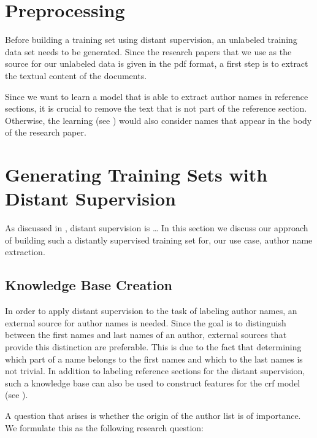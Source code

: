 \section{Preprocessing}\label{sec:ae-preprocessing}

Before building a training set using \gls{distant supervision}, an unlabeled training data set needs to be generated.
Since the research papers that we use as the source for our unlabeled data is given in the \gls{pdf} format, a first step is to extract the textual content of the documents.

Since we want to learn a model that is able to extract author names in reference sections, it is crucial to remove the text that is not part of the reference section.
Otherwise, the learning (see ) would also consider names that appear in the body of the research paper.

\section{Generating Training Sets with Distant Supervision}\label{sec:ae-distant-supervision}

As discussed in , distant supervision is \dots
In this section we discuss our approach of building such a distantly supervised training set for, our use case, author name extraction.


\subsection{Knowledge Base Creation}\label{subsec:ae-knowledge-base-creation}

In order to apply distant supervision to the task of labeling author names, an external source for author names is needed.
Since the goal is to distinguish between the first names and last names of an author, external sources that provide this distinction are preferable.
This is due to the fact that determining which part of a name belongs to the first names and which to the last names is not trivial.
In addition to labeling reference sections for the distant supervision, such a knowledge base can also be used to construct features for the \gls{crf} model (see ).

\bigskip

A question that arises is whether the origin of the author list is of importance.
We formulate this as the following research question:
\researchquestionone%

